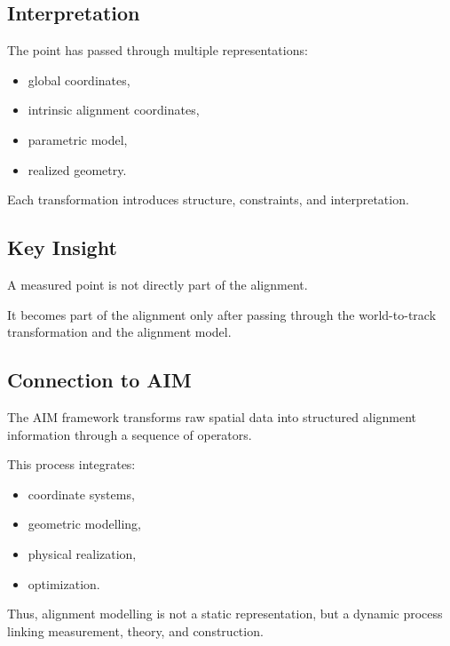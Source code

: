 \subsection{Interpretation}

The point has passed through multiple representations:
\begin{itemize}
\item global coordinates,
\item intrinsic alignment coordinates,
\item parametric model,
\item realized geometry.
\end{itemize}

Each transformation introduces structure, constraints, and
interpretation.

\subsection{Key Insight}

\begin{proposition}
A measured point is not directly part of the alignment.

It becomes part of the alignment only after passing through the
world-to-track transformation and the alignment model.
\end{proposition}

\subsection{Connection to AIM}

\begin{summary}
The AIM framework transforms raw spatial data into structured alignment
information through a sequence of operators.

This process integrates:
\begin{itemize}
\item coordinate systems,
\item geometric modelling,
\item physical realization,
\item optimization.
\end{itemize}

Thus, alignment modelling is not a static representation, but a dynamic
process linking measurement, theory, and construction.
\end{summary}
